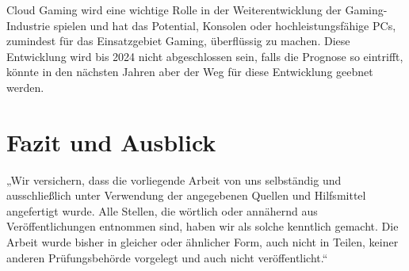 \documentclass[12pt,toc=bib,toc=listof]{scrreprt}
\newcounter{savepage}
\begin{document}
Cloud Gaming wird eine wichtige Rolle in der Weiterentwicklung der Gaming-Industrie spielen und hat das Potential, 
Konsolen oder hochleistungsfähige PCs, zumindest für das Einsatzgebiet Gaming, überflüssig zu machen. Diese Entwicklung 
wird bis 2024 nicht abgeschlossen sein, falls die Prognose so eintrifft, könnte in den nächsten Jahren aber der Weg 
für diese Entwicklung geebnet werden.

\chapter{Fazit und Ausblick} %
\label{sec:fazit}



\appendix
\newpage

\setcounter{page}{\thesavepage}



\newpage

\printbibliography[heading=head]



\newpage

\label{sec:erklaerung}

„Wir versichern, dass die vorliegende Arbeit von uns selbständig und ausschließlich unter Verwendung der angegebenen Quellen und Hilfsmittel angefertigt wurde. Alle Stellen, die wörtlich oder annähernd aus Veröffentlichungen entnommen sind, haben wir als solche kenntlich gemacht. Die Arbeit wurde bisher in gleicher oder ähnlicher Form, auch nicht in Teilen, keiner anderen Prüfungsbehörde vorgelegt und auch nicht veröffentlicht.“
\end{document}
